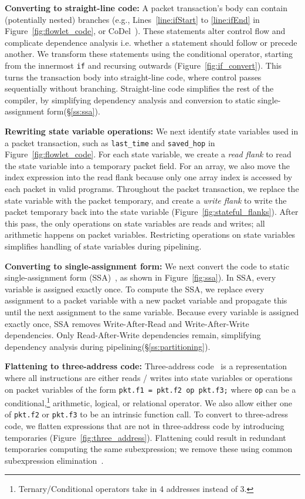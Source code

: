 \textbf{Converting to straight-line code: }A packet transaction's body can
contain (potentially nested) branches (e.g., Lines~\ref{line:ifStart} to
\ref{line:ifEnd} in Figure~\ref{fig:flowlet_code}, or CoDel~\cite{codel_code}).
These statements alter control flow and complicate dependence analysis i.e.
whether a statement should follow or precede another.  We transform these
statements using the conditional operator, starting from the innermost
\texttt{if} and recursing outwards (Figure~\ref{fig:if_convert}).  This turns
the transaction body into straight-line code, where control passes sequentially
without branching. Straight-line code simplifies the rest of the compiler, by
simplifying dependency analysis and conversion to static single-assignment
form(\S\ref{ss:ssa}).

\textbf{Rewriting state variable operations: }We next identify state variables
used in a packet transaction, such as \texttt{last\_time} and
\texttt{saved\_hop} in Figure~\ref{fig:flowlet_code}.  For each state variable,
we create a \textit{read flank} to read the state variable into a temporary
packet field. For an array, we also move the index expression into the read
flank because only one array index is accessed by each packet in valid
\pktlanguage programs.  Throughout the packet transaction, we replace the state
variable with the packet temporary, and create a \textit{write flank} to write
the packet temporary back into the state variable
(Figure~\ref{fig:stateful_flanks}). After this pass, the only operations on
state variables are reads and writes; all arithmetic happens on packet
variables. Restricting operations on state variables simplifies handling of
state variables during pipelining.

\textbf{Converting to single-assignment form: }We next convert the code to
static single-assignment form (SSA)~\cite{ssa}, as shown in
Figure~\ref{fig:ssa}). In SSA, every variable is assigned exactly once. To
compute the SSA, we replace every assignment to a packet variable with a new
packet variable and propagate this until the next assignment to the same
variable.  Because every variable is assigned exactly once, SSA removes
Write-After-Read and Write-After-Write dependencies.  Only Read-After-Write
dependencies remain, simplifying dependency analysis during
pipelining(\S\ref{ss:partitioning}).

\textbf{Flattening to three-address code: } Three-address code~\cite{tac} is a
representation where all instructions are either reads / writes into state
variables or operations on packet variables of the form \texttt{pkt.f1 = pkt.f2
op pkt.f3;} where \texttt{op} can be a
conditional,\footnote{Ternary/Conditional operators take in 4 addresses instead
of 3.} arithmetic, logical, or relational operator.  We also allow either one
of {\tt pkt.f2} or {\tt pkt.f3} to be an intrinsic function call.  To convert
to three-adress code, we flatten expressions that are not in three-address code
by introducing temporaries (Figure~\ref{fig:three_address}).  Flattening could
result in redundant temporaries computing the same subexpression; we remove
these using common subexpression elimination~\cite{cse}.

